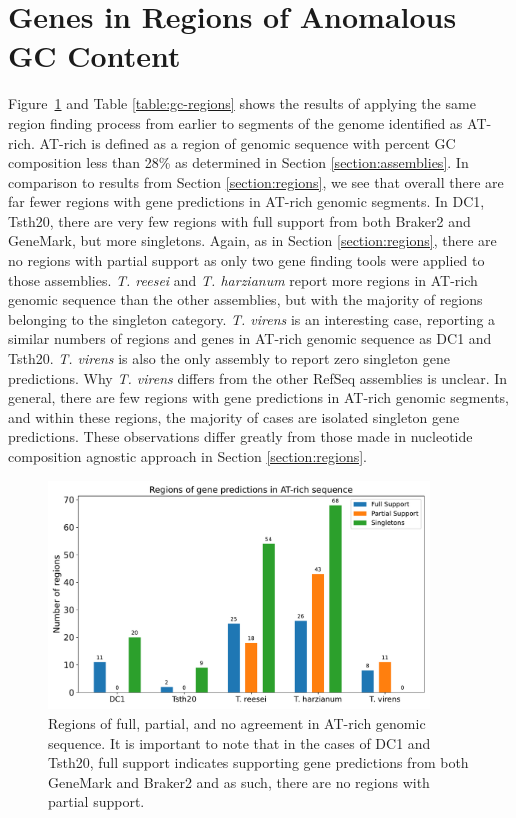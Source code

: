 \section{Genes in Regions of Anomalous GC Content}
\label{section:gc-regions}

Figure~\ref{fig:gc-regions} and Table \ref{table:gc-regions} shows the results of applying the same
region finding process from earlier to segments of the genome
identified as AT-rich. AT-rich is defined as a region of genomic
sequence with percent GC composition less than 28\% as determined in
Section \ref{section:assemblies}. In comparison to results from
Section \ref{section:regions}, we see that overall there are far fewer
regions with gene predictions in AT-rich genomic segments. In DC1,
Tsth20, there are very few regions with full support from both Braker2
and GeneMark, but more singletons. Again, as in Section
\ref{section:regions}, there are no regions with partial support as
only two gene finding tools were applied to those
assemblies. \textit{T. reesei} and \textit{T. harzianum} report more
regions in AT-rich genomic sequence than the other assemblies, but
with the majority of regions belonging to the singleton
category. \textit{T. virens} is an interesting case, reporting a
similar numbers of regions and genes in AT-rich genomic sequence as
DC1 and Tsth20. \textit{T. virens} is also the only assembly to report
zero singleton gene predictions. Why \textit{T. virens} differs from
the other RefSeq assemblies is unclear. In general, there are few
regions with gene predictions in AT-rich genomic segments, and within
these regions, the majority of cases are isolated singleton gene
predictions. These observations differ greatly from those made in
nucleotide composition agnostic approach in Section
\ref{section:regions}.

\begin{figure}
  \centering
  \includegraphics[width=0.90\textwidth]{figures/atrich-regions-barplot.pdf}
  \caption{Regions of full, partial, and no agreement in AT-rich genomic sequence. It is important to note that in the cases of DC1 and Tsth20, full support indicates supporting gene predictions from both GeneMark and Braker2 and as such, there are no regions with partial support.}
  \label{fig:gc-regions}
\end{figure}

